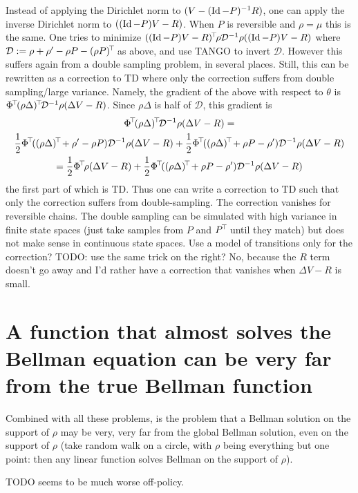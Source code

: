 \documentclass[11pt,a4paper]{article}
\newcommand{\Dir}{\mathcal{D}}
\begin{document}
Instead of applying the Dirichlet norm to $(V-(\operatorname{Id}-P)^{-1}R)$, one can
apply the inverse Dirichlet norm to $((\operatorname{Id}-P)V-R)$. When $P$ is
reversible and $\rho=\mu$ this
is the same. One tries to minimize
$\transp{((\Id-P)V-R)}\rho\Dir^{-1}\rho((\Id-P)V-R)$ where
$\Dir\deq \rho+\rho'-\rho P-\transp{(\rho P)}$ as above, and use
TANGO to invert $\Dir$. However this suffers again from a double
sampling problem, in several places. Still, this can be rewritten as a
correction to TD where only the correction suffers from double
sampling/large variance. Namely, the gradient of the above with respect
to $\theta$ is $\transp{\Phi}\transp{(\rho\Delta)} \Dir^{-1}\rho(\Delta V-R)$. Since
$\rho\Delta$ is half of $\Dir$, this gradient is 
\begin{gather}
\transp{\Phi}\transp{(\rho\Delta)} \Dir^{-1}\rho(\Delta V-R)=
\\
\frac12\transp{\Phi}(\transp{(\rho \Delta)}+\rho'-\rho P)\Dir^{-1}\rho(\Delta
V-R)+\frac12 \transp{\Phi}(\transp{(\rho \Delta)}+\rho P-\rho')\Dir^{-1}\rho(\Delta
V-R)
\\=\frac12\transp{\Phi}\rho(\Delta
V-R)+\frac12 \transp{\Phi}(\transp{(\rho \Delta)}+\rho P-\rho')\Dir^{-1}\rho(\Delta
V-R)
\end{gather}
the first part of which is TD. Thus one can write a correction to TD such
that only the correction suffers from double-sampling. The correction vanishes for reversible
chains. The double sampling can be simulated with high variance in finite
state spaces (just take samples from $P$ and $P^{\!\top}\!$ until they
match) but does not make sense in continuous state spaces. Use a model of
transitions only for the correction? TODO: use the same trick on the
right? No, because the $R$ term doesn't go away and I'd rather have a
correction that vanishes when $\Delta V-R$ is small.

\section{A function that almost solves the Bellman equation can be very
far from the true Bellman function}

Combined with all these problems, is the problem that a Bellman solution on the
support of $\rho$ may be very, very far from the global Bellman solution,
even on the support of $\rho$ (take random walk on a circle, with $\rho$
being everything but one point: then any linear function solves Bellman
on the support of $\rho$).

TODO seems to be much worse off-policy.
\end{document}

